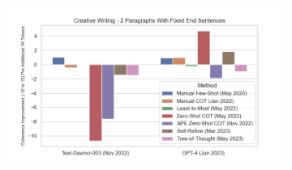 \documentclass{beamer}
\begin{document}
\begin{frame}
\begin{figure}[h]
\begin{subfigure}[h]{0.4925\textwidth}
                \centering
                \includegraphics[width=1.1\hsize]{../Output/cw_change_in_accuracy_quality_per_change_in_conversation_length_sorted_by_technique_age_transformed.png}
            \end{subfigure}
        \end{figure}
    \end{frame}
\end{document}
